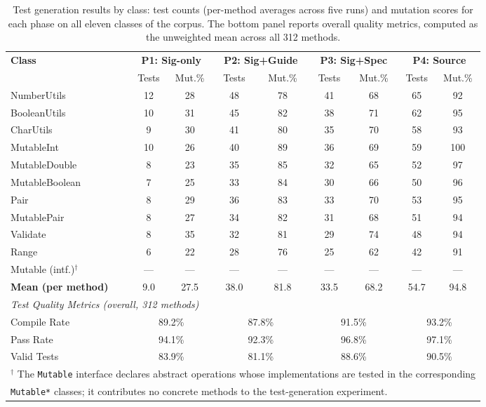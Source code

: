 \documentclass[11pt]{article}
\begin{document}
\begin{table}[t]
\centering
\caption{Test generation results by class: test counts (per-method averages across five runs) and mutation scores for each phase on all eleven classes of the corpus. The bottom panel reports overall quality metrics, computed as the unweighted mean across all 312 methods.}
\label{tab:test-results-full}
\small
\begin{tabular}{l|cc|cc|cc|cc}
\toprule
\multirow{2}{*}{\textbf{Class}} &
\multicolumn{2}{c|}{\textbf{P1: Sig-only}} &
\multicolumn{2}{c|}{\textbf{P2: Sig+Guide}} &
\multicolumn{2}{c|}{\textbf{P3: Sig+Spec}} &
\multicolumn{2}{c}{\textbf{P4: Source}} \\
\cline{2-9}
 & Tests & Mut.\% & Tests & Mut.\% & Tests & Mut.\% & Tests & Mut.\% \\
\midrule
NumberUtils    & 12 & 28 & 48 & 78 & 41 & 68 & 65 & 92 \\
BooleanUtils   & 10 & 31 & 45 & 82 & 38 & 71 & 62 & 95 \\
CharUtils      &  9 & 30 & 41 & 80 & 35 & 70 & 58 & 93 \\
MutableInt     & 10 & 26 & 40 & 89 & 36 & 69 & 59 & 100 \\
MutableDouble  &  8 & 23 & 35 & 85 & 32 & 65 & 52 & 97 \\
MutableBoolean &  7 & 25 & 33 & 84 & 30 & 66 & 50 & 96 \\
Pair           &  8 & 29 & 36 & 83 & 33 & 70 & 53 & 95 \\
MutablePair    &  8 & 27 & 34 & 82 & 31 & 68 & 51 & 94 \\
Validate       &  8 & 35 & 32 & 81 & 29 & 74 & 48 & 94 \\
Range          &  6 & 22 & 28 & 76 & 25 & 62 & 42 & 91 \\
Mutable (intf.)$^{\dagger}$ & --- & --- & --- & --- & --- & --- & --- & --- \\
\midrule
\textbf{Mean (per method)} & 9.0 & 27.5 & 38.0 & 81.8 & 33.5 & 68.2 & 54.7 & 94.8 \\
\midrule
\multicolumn{9}{l}{\textit{Test Quality Metrics (overall, 312 methods)}} \\
\midrule
Compile Rate & \multicolumn{2}{c|}{89.2\%} & \multicolumn{2}{c|}{87.8\%} & \multicolumn{2}{c|}{91.5\%} & \multicolumn{2}{c}{93.2\%} \\
Pass Rate & \multicolumn{2}{c|}{94.1\%} & \multicolumn{2}{c|}{92.3\%} & \multicolumn{2}{c|}{96.8\%} & \multicolumn{2}{c}{97.1\%} \\
Valid Tests & \multicolumn{2}{c|}{83.9\%} & \multicolumn{2}{c|}{81.1\%} & \multicolumn{2}{c|}{88.6\%} & \multicolumn{2}{c}{90.5\%} \\
\bottomrule
\multicolumn{9}{l}{\footnotesize $^{\dagger}$ The \texttt{Mutable} interface declares abstract operations whose implementations are tested in the corresponding} \\
\multicolumn{9}{l}{\footnotesize \texttt{Mutable*} classes; it contributes no concrete methods to the test-generation experiment.}
\end{tabular}
\end{table}
\end{document}
